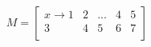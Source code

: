 \documentclass{article}
\begin{document}
\[
M=
  \begin{bmatrix}
    x \to 1 & 2 & ... & 4 & 5\\
    3 & 4 & 5 & 6 & 7\\
  \end{bmatrix}
\]
\end{document}

